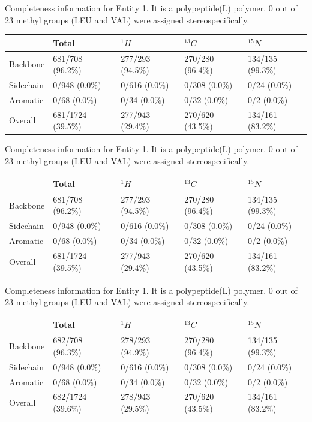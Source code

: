 Completeness information for Entity 1. It is a polypeptide(L) polymer. 0 out of 23 methyl groups (LEU and VAL) were assigned stereospecifically.\begin{longtable}{|l|l|l|l|l|}
\hline
  & Total & $^{1}H$ & $^{13}C$ & $^{15}N$\\\hline
Backbone & 681/708 (96.2\%)& 277/293 (94.5\%)& 270/280 (96.4\%)& 134/135 (99.3\%) \\
\hline
Sidechain & 0/948 (0.0\%)& 0/616 (0.0\%)& 0/308 (0.0\%)& 0/24 (0.0\%) \\
\hline
Aromatic & 0/68 (0.0\%)& 0/34 (0.0\%)& 0/32 (0.0\%)& 0/2 (0.0\%) \\
\hline
Overall & 681/1724 (39.5\%)& 277/943 (29.4\%)& 270/620 (43.5\%)& 134/161 (83.2\%) \\
\hline
\end{longtable}
Completeness information for Entity 1. It is a polypeptide(L) polymer. 0 out of 23 methyl groups (LEU and VAL) were assigned stereospecifically.\begin{longtable}{|l|l|l|l|l|}
\hline
  & Total & $^{1}H$ & $^{13}C$ & $^{15}N$\\\hline
Backbone & 681/708 (96.2\%)& 277/293 (94.5\%)& 270/280 (96.4\%)& 134/135 (99.3\%) \\
\hline
Sidechain & 0/948 (0.0\%)& 0/616 (0.0\%)& 0/308 (0.0\%)& 0/24 (0.0\%) \\
\hline
Aromatic & 0/68 (0.0\%)& 0/34 (0.0\%)& 0/32 (0.0\%)& 0/2 (0.0\%) \\
\hline
Overall & 681/1724 (39.5\%)& 277/943 (29.4\%)& 270/620 (43.5\%)& 134/161 (83.2\%) \\
\hline
\end{longtable}
Completeness information for Entity 1. It is a polypeptide(L) polymer. 0 out of 23 methyl groups (LEU and VAL) were assigned stereospecifically.\begin{longtable}{|l|l|l|l|l|}
\hline
  & Total & $^{1}H$ & $^{13}C$ & $^{15}N$\\\hline
Backbone & 682/708 (96.3\%)& 278/293 (94.9\%)& 270/280 (96.4\%)& 134/135 (99.3\%) \\
\hline
Sidechain & 0/948 (0.0\%)& 0/616 (0.0\%)& 0/308 (0.0\%)& 0/24 (0.0\%) \\
\hline
Aromatic & 0/68 (0.0\%)& 0/34 (0.0\%)& 0/32 (0.0\%)& 0/2 (0.0\%) \\
\hline
Overall & 682/1724 (39.6\%)& 278/943 (29.5\%)& 270/620 (43.5\%)& 134/161 (83.2\%) \\
\hline
\end{longtable}
